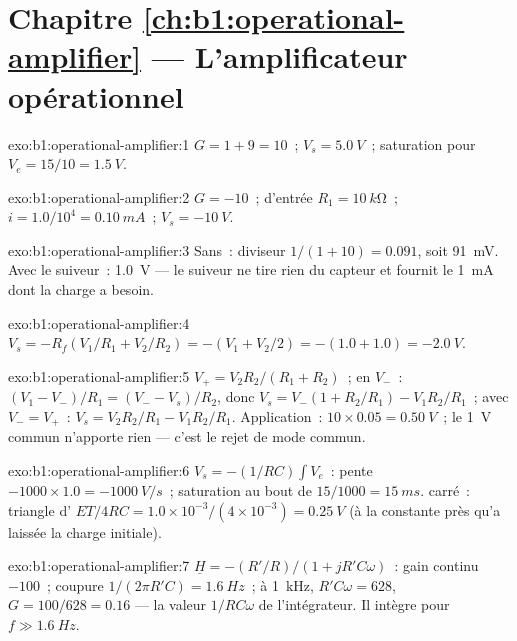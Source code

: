 \section*{Chapitre \ref{ch:b1:operational-amplifier} --- L'amplificateur opérationnel}

\begin{solution}{exo:b1:operational-amplifier:1}
$G = 1 + 9 = 10$~; $V_s = \qty{5.0}{V}$~; saturation pour $V_e = 15/10 =
\qty{1.5}{V}$.
\end{solution}

\begin{solution}{exo:b1:operational-amplifier:2}
$G = -10$~;  d'entrée $R_1 = \qty{10}{k\ohm}$~; $i = 1.0/10^4 =
\qty{0.10}{mA}$~; $V_s = \qty{-10}{V}$.
\end{solution}

\begin{solution}{exo:b1:operational-amplifier:3}
Sans~: diviseur $1/(1 + 10) = 0.091$, soit \qty{91}{mV}. Avec le
suiveur~: \qty{1.0}{V} --- le suiveur ne tire rien du capteur et fournit
le \qty{1}{mA} dont la charge a besoin.
\end{solution}

\begin{solution}{exo:b1:operational-amplifier:4}
$V_s = -R_f(V_1/R_1 + V_2/R_2) = -(V_1 + V_2/2) = -(1.0 + 1.0) = \qty{-2.0}{V}$.
\end{solution}

\begin{solution}{exo:b1:operational-amplifier:5}
$V_+ = V_2R_2/(R_1 + R_2)$~; en $V_-$~: $(V_1 - V_-)/R_1 = (V_- - V_s)/R_2$,
donc $V_s = V_-(1 + R_2/R_1) - V_1R_2/R_1$~; avec $V_- = V_+$~:
$V_s = V_2R_2/R_1 - V_1R_2/R_1$. Application~: $10 \times 0.05 = \qty{0.50}{V}$~;
le \qty{1}{V} commun n'apporte rien --- c'est le rejet de mode commun.
\end{solution}

\begin{solution}{exo:b1:operational-amplifier:6}
$V_s = -(1/RC)\int V_e$~: pente $-1000 \times 1.0 = \qty{-1000}{V/s}$~;
saturation au bout de $15/1000 = \qty{15}{ms}$.  carré~: triangle
d' $ET/4RC = 1.0 \times 10^{-3}/(4 \times 10^{-3}) = \qty{0.25}{V}$
(à la constante près qu'a laissée la charge initiale).
\end{solution}

\begin{solution}{exo:b1:operational-amplifier:7}
$\underline H = -(R'/R)/(1 + jR'C\omega)$~: gain continu $-100$~; coupure
$1/(2\pi R'C) = \qty{1.6}{Hz}$~; à \qty{1}{kHz}, $R'C\omega = 628$, $G =
100/628 = 0.16$ --- la valeur $1/RC\omega$ de l'intégrateur. Il intègre
pour $f \gg \qty{1.6}{Hz}$.
\end{solution}

